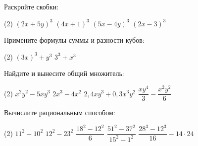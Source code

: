 \begin{homework}[number=1]
	\begin{listofex}
		\item Раскройте скобки:
		\begin{tasks}(2)
			\task \( (2x+5y)^3 \)
			\task \( (4x+1)^3 \)
			\task \( (5x-4y)^3 \)
			\task \( (2x-3)^3 \)
		\end{tasks}
		\item Примените формулы суммы и разности кубов:
		\begin{tasks}(2)
			\task \( (3x)^3+y^3 \)
			\task \( 3^3+x^3 \)
		\end{tasks}
		\item Найдите и вынесите общий множитель:
		\begin{tasks}(2)
			\task \( x^2y^2-5xy^3 \)
			\task \( 2x^3-4x^2 \)
			\task \( 2,4xy^3+0,3x^3y^2 \)
			\task \( \dfrac{xy^4}{3}-\dfrac{x^2y^2}{6} \)
		\end{tasks}
		\item Вычислите рациональным способом:
		\begin{tasks}(2)
			\task \( 11^2-10^2 \)
			\task \( 12^2-23^2 \)
			\task \( \dfrac{18^2-12^2}{6} \)
			\task \( \dfrac{51^2-37^2}{15^2-1^2} \)
			\task \( \dfrac{28^3-12^3}{16}-14\cdot24 \)
		\end{tasks}
	\end{listofex}
\end{homework}

